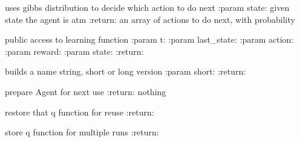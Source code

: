 \documentclass[letterpaper,10pt,english]{sphinxmanual}
\begin{document}
\begin{fulllineitems}
\begin{fulllineitems}
\label{Agents:morl_agents.MORLScalarizingAgent.get_learned_action_gibbs_distribution}
uses gibbs distribution to decide which action to do next
:param state: given state the agent is atm
:return: an array of actions to do next, with probability

\end{fulllineitems}


\begin{fulllineitems}
\label{Agents:morl_agents.MORLScalarizingAgent.learn}
public access to learning function
:param t:
:param last\_state:
:param action:
:param reward:
:param state:
:return:

\end{fulllineitems}


\begin{fulllineitems}
\label{Agents:morl_agents.MORLScalarizingAgent.name}
builds a name string, short or long version
:param short:
:return:

\end{fulllineitems}


\begin{fulllineitems}
\label{Agents:morl_agents.MORLScalarizingAgent.reset}
prepare Agent for next use
:return: nothing

\end{fulllineitems}


\begin{fulllineitems}
\label{Agents:morl_agents.MORLScalarizingAgent.restore}
restore that q function for reuse
:return:

\end{fulllineitems}


\begin{fulllineitems}
\label{Agents:morl_agents.MORLScalarizingAgent.save}
store q function for multiple runs
:return:

\end{fulllineitems}


\end{fulllineitems}
\end{document}
